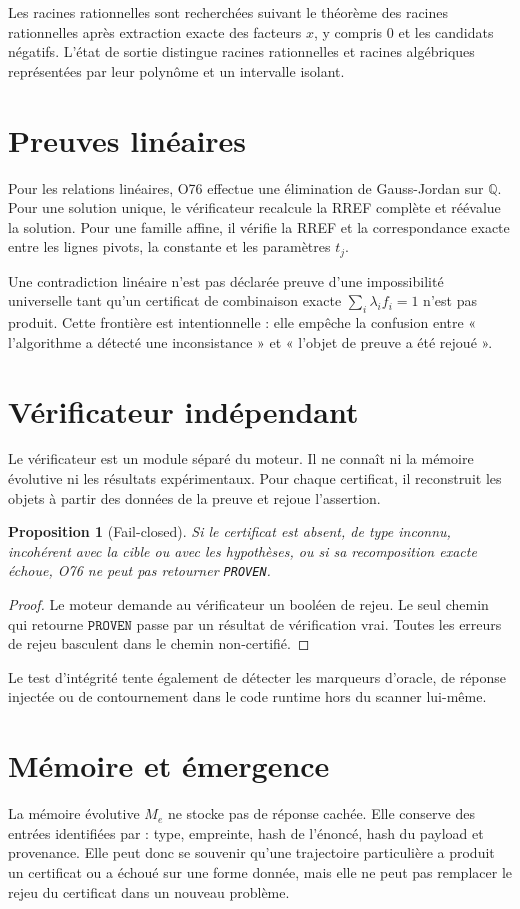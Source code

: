 \documentclass[11pt,a4paper]{article}
\newtheorem{proposition}{Proposition}[section]
\newcommand{\Prov}{\texttt{PROVEN}}
\begin{document}
Les racines rationnelles sont recherchées suivant le théorème des racines rationnelles après extraction exacte des facteurs $x$, y compris $0$ et les candidats négatifs. L'état de sortie distingue racines rationnelles et racines algébriques représentées par leur polynôme et un intervalle isolant.

\section{Preuves linéaires}
Pour les relations linéaires, O76 effectue une élimination de Gauss-Jordan sur $\mathbb Q$. Pour une solution unique, le vérificateur recalcule la RREF complète et réévalue la solution. Pour une famille affine, il vérifie la RREF et la correspondance exacte entre les lignes pivots, la constante et les paramètres $t_j$.

Une contradiction linéaire n'est pas déclarée preuve d'une impossibilité universelle tant qu'un certificat de combinaison exacte $\sum_i\lambda_i f_i=1$ n'est pas produit. Cette frontière est intentionnelle : elle empêche la confusion entre « l'algorithme a détecté une inconsistance » et « l'objet de preuve a été rejoué ».

\section{Vérificateur indépendant}
Le vérificateur est un module séparé du moteur. Il ne connaît ni la mémoire évolutive ni les résultats expérimentaux. Pour chaque certificat, il reconstruit les objets à partir des données de la preuve et rejoue l'assertion.

\begin{proposition}[Fail-closed]
Si le certificat est absent, de type inconnu, incohérent avec la cible ou avec les hypothèses, ou si sa recomposition exacte échoue, O76 ne peut pas retourner \Prov.
\end{proposition}
\begin{proof}
Le moteur demande au vérificateur un booléen de rejeu. Le seul chemin qui retourne $\Prov$ passe par un résultat de vérification vrai. Toutes les erreurs de rejeu basculent dans le chemin non-certifié.
\end{proof}

Le test d'intégrité tente également de détecter les marqueurs d'oracle, de réponse injectée ou de contournement dans le code runtime hors du scanner lui-même.

\section{Mémoire et émergence}
La mémoire évolutive $M_e$ ne stocke pas de réponse cachée. Elle conserve des entrées identifiées par : type, empreinte, hash de l'énoncé, hash du payload et provenance. Elle peut donc se souvenir qu'une trajectoire particulière a produit un certificat ou a échoué sur une forme donnée, mais elle ne peut pas remplacer le rejeu du certificat dans un nouveau problème.
\end{document}
